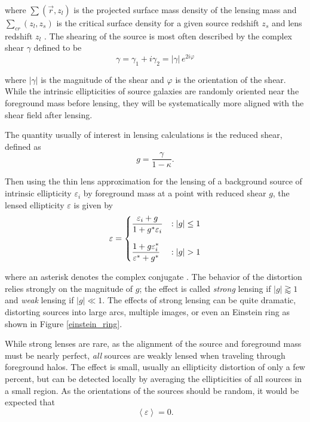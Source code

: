 \documentclass[%
 reprint,
 amsmath,amssymb,
 aps,nofootinbib
]{revtex4-1}
\begin{document}
\noindent where $\sum(\vec{r},z_l)$ is the projected surface mass density of the lensing mass and $\sum_{cr}(z_l,z_s)$ is the critical surface density for a given source redshift $z_s$ and lens redshift $z_l$ \cite{??}. The shearing of the source is most often described by the complex shear $\gamma$ defined to be
\begin{equation}\label{complex_shear}
\gamma=\gamma_1+i\gamma_2=|\gamma|\,e^{2i\varphi}
\end{equation}

\noindent where $|\gamma|$ is the magnitude of the shear and $\varphi$ is the orientation of the shear. While the intrinsic ellipticities of source galaxies are randomly oriented near the foreground mass before lensing, they will be systematically more aligned with the shear field after lensing.%

The quantity usually of interest in lensing calculations is the reduced shear, defined as
\begin{equation}\label{reduced_shear}
g=\frac{\gamma}{1-\kappa}.
\end{equation}

\noindent Then using the thin lens approximation for the lensing of a background source of intrinsic ellipticity $\varepsilon_i$ by foreground mass at a point with reduced shear $g$, the lensed ellipticity $\varepsilon$ is given by
\begin{equation}\label{lensing}
 \varepsilon = \begin{dcases}
      \frac{\varepsilon_i+g}{1+g^*\varepsilon_i} & : |g|\leq1 \\[0.75em]
       \frac{1+g\varepsilon_i^*}{\varepsilon^*+g^*} & : |g|>1
   \end{dcases}
\end{equation}

\noindent where an asterisk denotes the complex conjugate \cite{schneider}. The behavior of the distortion relies strongly on the magnitude of $g$; the
effect is called \textit{strong} lensing if $|g|\gtrapprox1$ and \textit{weak} lensing if $|g|\ll1$. The effects of strong lensing can be quite dramatic, distorting sources into large arcs, multiple images, or even an Einstein ring as shown in Figure \ref{einstein_ring}.

While strong lenses are rare, as the alignment of the source and foreground mass must be nearly perfect, \textit{all} sources are weakly lensed when traveling through foreground halos. The effect is small, usually an ellipticity distortion of only a few percent, but can be detected locally by averaging the ellipticities of all sources in a small region. As the orientations of the sources should be random, it would be expected that
$$\left<\varepsilon\right>=0.$$
\end{document}
